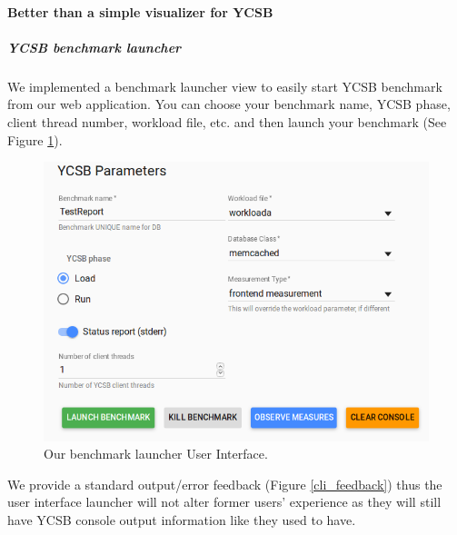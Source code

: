 \documentclass[a4paper,11pt]{report}
\begin{document}
\clearpage

\paragraph{Better than a simple visualizer for YCSB}

\subparagraph{YCSB benchmark launcher}

We implemented a benchmark launcher view to easily start YCSB benchmark from our web application. You can choose your benchmark name, YCSB phase, client thread number, workload file, etc. and then launch your benchmark (See Figure \ref{launcher_ui}).

\begin{figure}[ht]
\begin{center}
\includegraphics[width=1\linewidth]{images/launcher_ui.png}
\caption{Our benchmark launcher User Interface.}
\label{launcher_ui}
\end{center}
\end{figure}

We provide a standard output/error feedback (Figure \ref{cli_feedback}) thus the user interface launcher will not alter former users' experience as they will still have YCSB console output information like they used to have.
\end{document}

